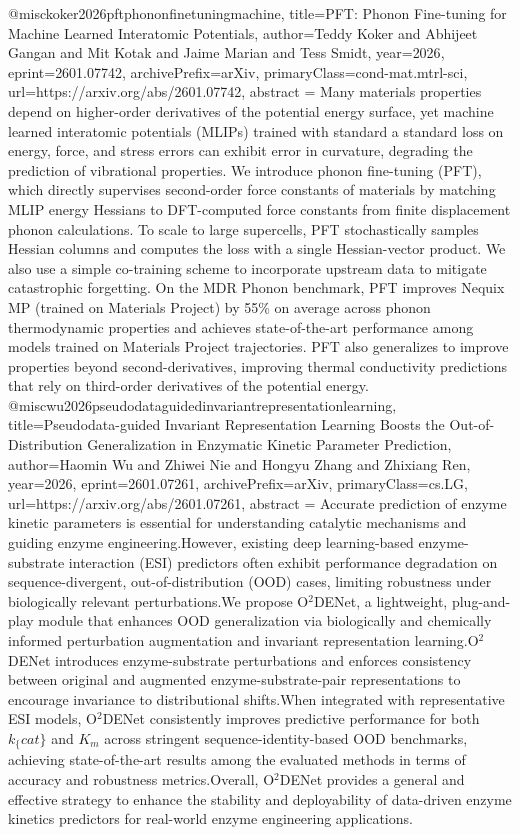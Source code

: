 {}@misc{koker2026pftphononfinetuningmachine,
      title={PFT: Phonon Fine-tuning for Machine Learned Interatomic Potentials}, 
      author={Teddy Koker and Abhijeet Gangan and Mit Kotak and Jaime Marian and Tess Smidt},
      year={2026},
      eprint={2601.07742},
      archivePrefix={arXiv},
      primaryClass={cond-mat.mtrl-sci},
      url={https://arxiv.org/abs/2601.07742},
      abstract = {Many materials properties depend on higher-order derivatives of the potential energy surface, yet machine learned interatomic potentials (MLIPs) trained with standard a standard loss on energy, force, and stress errors can exhibit error in curvature, degrading the prediction of vibrational properties. We introduce phonon fine-tuning (PFT), which directly supervises second-order force constants of materials by matching MLIP energy Hessians to DFT-computed force constants from finite displacement phonon calculations. To scale to large supercells, PFT stochastically samples Hessian columns and computes the loss with a single Hessian-vector product. We also use a simple co-training scheme to incorporate upstream data to mitigate catastrophic forgetting. On the MDR Phonon benchmark, PFT improves Nequix MP (trained on Materials Project) by 55\% on average across phonon thermodynamic properties and achieves state-of-the-art performance among models trained on Materials Project trajectories. PFT also generalizes to improve properties beyond second-derivatives, improving thermal conductivity predictions that rely on third-order derivatives of the potential energy.}
}@misc{wu2026pseudodataguidedinvariantrepresentationlearning,
      title={Pseudodata-guided Invariant Representation Learning Boosts the Out-of-Distribution Generalization in Enzymatic Kinetic Parameter Prediction}, 
      author={Haomin Wu and Zhiwei Nie and Hongyu Zhang and Zhixiang Ren},
      year={2026},
      eprint={2601.07261},
      archivePrefix={arXiv},
      primaryClass={cs.LG},
      url={https://arxiv.org/abs/2601.07261},
      abstract = {Accurate prediction of enzyme kinetic parameters is essential for understanding catalytic mechanisms and guiding enzyme engineering.However, existing deep learning-based enzyme-substrate interaction (ESI) predictors often exhibit performance degradation on sequence-divergent, out-of-distribution (OOD) cases, limiting robustness under biologically relevant perturbations.We propose O$^2$DENet, a lightweight, plug-and-play module that enhances OOD generalization via biologically and chemically informed perturbation augmentation and invariant representation learning.O$^2$DENet introduces enzyme-substrate perturbations and enforces consistency between original and augmented enzyme-substrate-pair representations to encourage invariance to distributional shifts.When integrated with representative ESI models, O$^2$DENet consistently improves predictive performance for both $k_\{cat\}$ and $K_m$ across stringent sequence-identity-based OOD benchmarks, achieving state-of-the-art results among the evaluated methods in terms of accuracy and robustness metrics.Overall, O$^2$DENet provides a general and effective strategy to enhance the stability and deployability of data-driven enzyme kinetics predictors for real-world enzyme engineering applications.}
}
